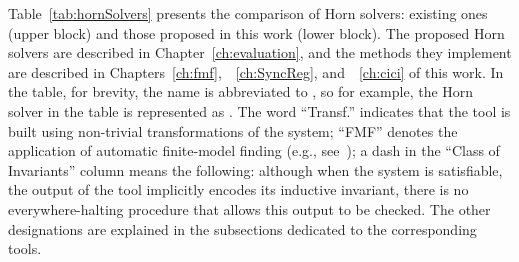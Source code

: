 Table~\cref{tab:hornSolvers} presents the comparison of Horn solvers: existing ones (upper block) and those proposed in this work (lower block). The proposed Horn solvers are described in Chapter~\ref{ch:evaluation}, and the methods they implement are described in Chapters~\ref{ch:fmf},~~\ref{ch:SyncReg}, and~~\ref{ch:cici} of this work. In the table, for brevity, the name \theringen{} is abbreviated to \theringenShort{}, so for example, the Horn solver \ringenSync{} in the table is represented as \ringenSyncShort{}. The word ``Transf.'' indicates that the tool is built using non-trivial transformations of the system; ``FMF'' denotes the application of automatic finite-model finding (e.g., see~\cite{10.1007/978-3-319-40970-2_20,reynolds2013finite}); a dash in the ``Class of Invariants'' column means the following: although when the system is satisfiable, the output of the tool implicitly encodes its inductive invariant, there is no everywhere-halting procedure that allows this output to be checked. The other designations are explained in the subsections dedicated to the corresponding tools.

